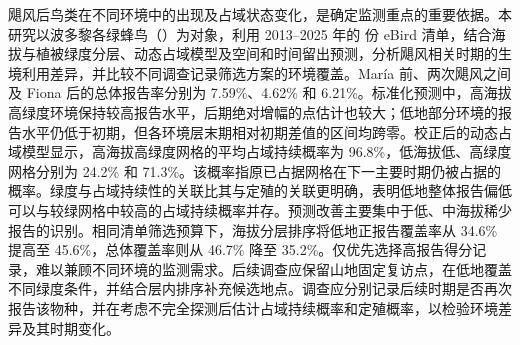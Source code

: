 飓风后鸟类在不同环境中的出现及占域状态变化，是确定监测重点的重要依据。本研究以波多黎各绿蜂鸟（\Rm）为对象，利用 2013--2025 年的 \nChecklists{} 份 eBird 清单，结合海拔与植被绿度分层、动态占域模型及空间和时间留出预测，分析飓风相关时期的生境利用差异，并比较不同调查记录筛选方案的环境覆盖。María 前、两次飓风之间及 Fiona 后的总体报告率分别为 7.59\%、4.62\% 和 6.21\%。标准化预测中，高海拔高绿度环境保持较高报告水平，后期绝对增幅的点估计也较大；低地部分环境的报告水平仍低于初期，但各环境层末期相对初期差值的区间均跨零。校正后的动态占域模型显示，高海拔高绿度网格的平均占域持续概率为 96.8\%，低海拔低、高绿度网格分别为 24.2\% 和 71.3\%。该概率指原已占据网格在下一主要时期仍被占据的概率。绿度与占域持续性的关联比其与定殖的关联更明确，表明低地整体报告偏低可以与较绿网格中较高的占域持续概率并存。预测改善主要集中于低、中海拔稀少报告的识别。相同清单筛选预算下，海拔分层排序将低地正报告覆盖率从 34.6\% 提高至 45.6\%，总体覆盖率则从 46.7\% 降至 35.2\%。仅优先选择高报告得分记录，难以兼顾不同环境的监测需求。后续调查应保留山地固定复访点，在低地覆盖不同绿度条件，并结合层内排序补充候选地点。调查应分别记录后续时期是否再次报告该物种，并在考虑不完全探测后估计占域持续概率和定殖概率，以检验环境差异及其时期变化。
